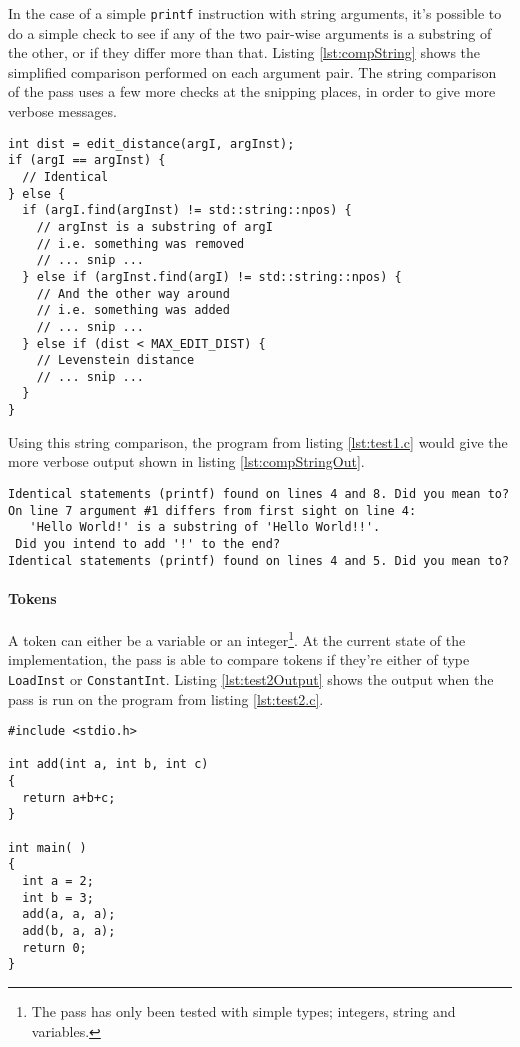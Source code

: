 \documentclass[a4paper,11pt]{article}
\theoremstyle{mytheor}
\begin{document}
In the case of a simple \verb!printf! instruction with string arguments,
it's possible to do a simple check to see if any of the two pair-wise arguments is a substring of the other,
or if they differ more than that.
Listing \ref{lst:compString} shows the simplified comparison performed on each argument pair.
The string comparison of the pass uses a few more checks at the snipping places, in order to give more verbose messages.
\begin{lstlisting}[caption={Compare string arguments},label={lst:compString}]
int dist = edit_distance(argI, argInst);
if (argI == argInst) {
  // Identical
} else {
  if (argI.find(argInst) != std::string::npos) {
    // argInst is a substring of argI
    // i.e. something was removed
    // ... snip ...
  } else if (argInst.find(argI) != std::string::npos) {
    // And the other way around
    // i.e. something was added
    // ... snip ...
  } else if (dist < MAX_EDIT_DIST) {
    // Levenstein distance
    // ... snip ...
  }
}
\end{lstlisting}
Using this string comparison, the program from listing \ref{lst:test1.c} would give the more verbose output shown in listing \ref{lst:compStringOut}.
\begin{lstlisting}[caption={Compare string arguments, verbose output},label={lst:compStringOut}]
Identical statements (printf) found on lines 4 and 8. Did you mean to?
On line 7 argument #1 differs from first sight on line 4:
   'Hello World!' is a substring of 'Hello World!!'.
 Did you intend to add '!' to the end?
Identical statements (printf) found on lines 4 and 5. Did you mean to?
\end{lstlisting}


\paragraph{Tokens} A token can either be a variable or an integer\footnote{The pass has only been tested with simple types; integers, string and variables.}.
At the current state of the implementation, the pass is able to compare tokens if they're either of type \verb!LoadInst! or \verb!ConstantInt!.
Listing \ref{lst:test2Output} shows the output when the pass is run on the program from listing \ref{lst:test2.c}.

\begin{lstlisting}[caption={test2.c},label={lst:test2.c}]
#include <stdio.h>

int add(int a, int b, int c)
{
  return a+b+c;
}

int main( )
{
  int a = 2;
  int b = 3;
  add(a, a, a);
  add(b, a, a);
  return 0;
}
\end{lstlisting}
\end{document}
